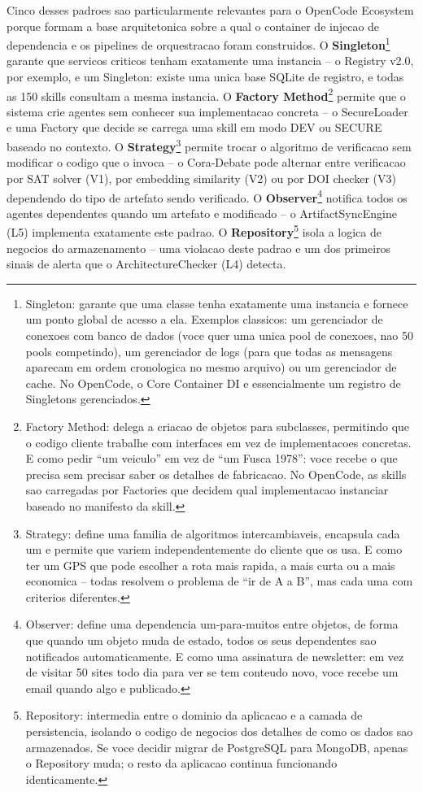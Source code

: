 \documentclass[12pt,a4paper,oneside,sumario=tradicional,chapter=TITLE,section=TITLE,subsection=TITLE,english,brazil]{abntex2}
\begin{document}
Cinco desses padroes sao particularmente relevantes para o OpenCode Ecosystem porque formam a base arquitetonica sobre a qual o container de injecao de dependencia e os pipelines de orquestracao foram construidos. O \textbf{Singleton}\footnote{Singleton: garante que uma classe tenha exatamente uma instancia e fornece um ponto global de acesso a ela. Exemplos classicos: um gerenciador de conexoes com banco de dados (voce quer uma unica pool de conexoes, nao 50 pools competindo), um gerenciador de logs (para que todas as mensagens aparecam em ordem cronologica no mesmo arquivo) ou um gerenciador de cache. No OpenCode, o Core Container DI e essencialmente um registro de Singletons gerenciados.} garante que servicos criticos tenham exatamente uma instancia -- o Registry v2.0, por exemplo, e um Singleton: existe uma unica base SQLite de registro, e todas as 150 skills consultam a mesma instancia. O \textbf{Factory Method}\footnote{Factory Method: delega a criacao de objetos para subclasses, permitindo que o codigo cliente trabalhe com interfaces em vez de implementacoes concretas. E como pedir ``um veiculo'' em vez de ``um Fusca 1978'': voce recebe o que precisa sem precisar saber os detalhes de fabricacao. No OpenCode, as skills sao carregadas por Factories que decidem qual implementacao instanciar baseado no manifesto da skill.} permite que o sistema crie agentes sem conhecer sua implementacao concreta -- o SecureLoader e uma Factory que decide se carrega uma skill em modo DEV ou SECURE baseado no contexto. O \textbf{Strategy}\footnote{Strategy: define uma familia de algoritmos intercambiaveis, encapsula cada um e permite que variem independentemente do cliente que os usa. E como ter um GPS que pode escolher a rota mais rapida, a mais curta ou a mais economica -- todas resolvem o problema de ``ir de A a B'', mas cada uma com criterios diferentes.} permite trocar o algoritmo de verificacao sem modificar o codigo que o invoca -- o Cora-Debate pode alternar entre verificacao por SAT solver (V1), por embedding similarity (V2) ou por DOI checker (V3) dependendo do tipo de artefato sendo verificado. O \textbf{Observer}\footnote{Observer: define uma dependencia um-para-muitos entre objetos, de forma que quando um objeto muda de estado, todos os seus dependentes sao notificados automaticamente. E como uma assinatura de newsletter: em vez de visitar 50 sites todo dia para ver se tem conteudo novo, voce recebe um email quando algo e publicado.} notifica todos os agentes dependentes quando um artefato e modificado -- o ArtifactSyncEngine (L5) implementa exatamente este padrao. O \textbf{Repository}\footnote{Repository: intermedia entre o dominio da aplicacao e a camada de persistencia, isolando o codigo de negocios dos detalhes de como os dados sao armazenados. Se voce decidir migrar de PostgreSQL para MongoDB, apenas o Repository muda; o resto da aplicacao continua funcionando identicamente.} isola a logica de negocios do armazenamento -- uma violacao deste padrao e um dos primeiros sinais de alerta que o ArchitectureChecker (L4) detecta.
\end{document}
